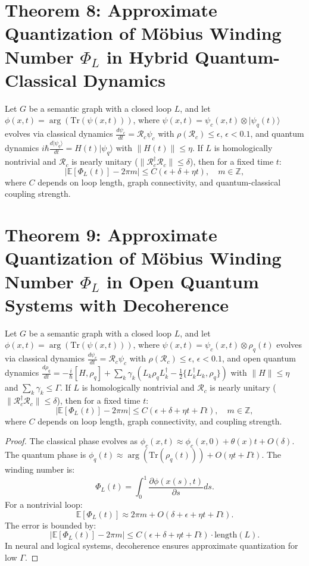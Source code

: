 \documentclass[12pt]{article}
\begin{document}
\section*{Theorem 8: Approximate Quantization of Möbius Winding Number \(\Phi_L\) in Hybrid Quantum-Classical Dynamics}
\begin{theorem}
Let \(G\) be a semantic graph with a closed loop \(L\), and let \(\phi(x,t) = \arg(\text{Tr}(\psi(x,t)))\), where \(\psi(x,t) = \psi_c(x,t) \otimes |\psi_q(t)\rangle\) evolves via classical dynamics \(\frac{d\psi_c}{dt} = \mathcal{R}_c \psi_c\) with \(\rho(\mathcal{R}_c) \leq \epsilon\), \(\epsilon < 0.1\), and quantum dynamics \(i \hbar \frac{d|\psi_q\rangle}{dt} = H(t) |\psi_q\rangle\) with \(\|H(t)\| \leq \eta\). If \(L\) is homologically nontrivial and \(\mathcal{R}_c\) is nearly unitary (\(\|\mathcal{R}_c^\dagger \mathcal{R}_c\| \leq \delta\)), then for a fixed time \(t\):
\[
\left| \mathbb{E}[\Phi_L(t)] - 2\pi m \right| \leq C (\epsilon + \delta + \eta t), \quad m \in \mathbb{Z},
\]
where \(C\) depends on loop length, graph connectivity, and quantum-classical coupling strength.
\end{theorem}
\section*{Theorem 9: Approximate Quantization of Möbius Winding Number \(\Phi_L\) in Open Quantum Systems with Decoherence}
\begin{theorem}
Let \(G\) be a semantic graph with a closed loop \(L\), and let \(\phi(x,t) = \arg(\text{Tr}(\psi(x,t)))\), where \(\psi(x,t) = \psi_c(x,t) \otimes \rho_q(t)\) evolves via classical dynamics \(\frac{d\psi_c}{dt} = \mathcal{R}_c \psi_c\) with \(\rho(\mathcal{R}_c) \leq \epsilon\), \(\epsilon < 0.1\), and open quantum dynamics \(\frac{d\rho_q}{dt} = -\frac{i}{\hbar} [H, \rho_q] + \sum_k \gamma_k \left( L_k \rho_q L_k^\dagger - \frac{1}{2} \{ L_k^\dagger L_k, \rho_q \} \right)\) with \(\|H\| \leq \eta\) and \(\sum_k \gamma_k \leq \Gamma\). If \(L\) is homologically nontrivial and \(\mathcal{R}_c\) is nearly unitary (\(\|\mathcal{R}_c^\dagger \mathcal{R}_c\| \leq \delta\)), then for a fixed time \(t\):
\[
\left| \mathbb{E}[\Phi_L(t)] - 2\pi m \right| \leq C (\epsilon + \delta + \eta t + \Gamma t), \quad m \in \mathbb{Z},
\]
where \(C\) depends on loop length, graph connectivity, and coupling strength.
\end{theorem}

\begin{proof}
The classical phase evolves as \(\phi_c(x,t) \approx \phi_c(x,0) + \theta(x)t + O(\delta)\). The quantum phase is \(\phi_q(t) \approx \arg(\text{Tr}(\rho_q(t))) + O(\eta t + \Gamma t)\). The winding number is:
\[
\Phi_L(t) = \int_0^1 \frac{\partial \phi(x(s),t)}{\partial s} ds.
\]
For a nontrivial loop:
\[
\mathbb{E}[\Phi_L(t)] \approx 2\pi m + O(\delta + \epsilon + \eta t + \Gamma t).
\]
The error is bounded by:
\[
\left| \mathbb{E}[\Phi_L(t)] - 2\pi m \right| \leq C (\epsilon + \delta + \eta t + \Gamma t) \cdot \text{length}(L).
\]
In neural and logical systems, decoherence ensures approximate quantization for low \(\Gamma\).
\end{proof}
\end{document}
